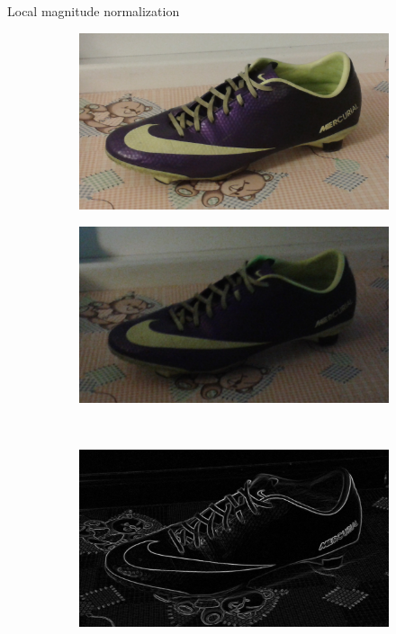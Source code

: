 \documentclass[14pt,t]{beamer}
\begin{document}
\begin{frame}{Local magnitude normalization}
\begin{figure}[p]
	\centering
	\begin{subfigure}[t]{0.4\textwidth}
		\includegraphics[width=\textwidth]{img/pixelNormalizationExample1.png}
	\end{subfigure}
	\begin{subfigure}[t]{0.4\textwidth}
		\includegraphics[width=\textwidth]{img/pixelNormalizationExample2.png}
	\end{subfigure}\\
	\vspace{0.75mm}
	\begin{subfigure}[t]{0.4\textwidth}
		\includegraphics[width=\textwidth]{img/pixelNormalizationExample3.png}

\end{subfigure}
\end{figure}
\end{frame}
\end{document}
